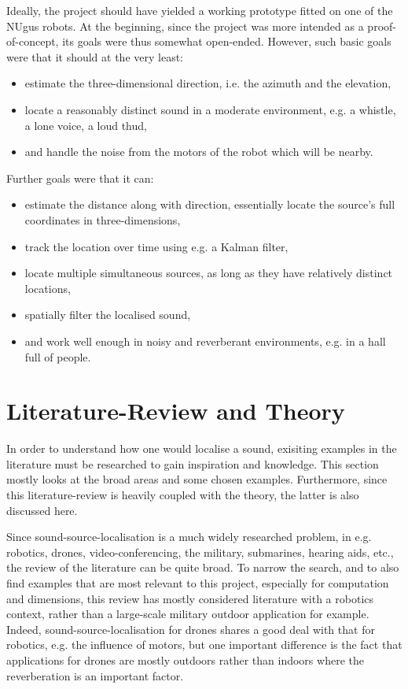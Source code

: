 \documentclass[notitlepage]{report}
\begin{document}
Ideally, the project should have yielded a working prototype fitted on one of the NUgus robots. At the beginning, since the project was more intended as a proof-of-concept, its goals were thus somewhat open-ended. However, such basic goals were that it should at the very least:
\begin{itemize}
	\item estimate the three-dimensional direction, i.e. the azimuth and the elevation,
	\item locate a reasonably distinct sound in a moderate environment, e.g. a whistle, a lone voice, a loud thud,
	\item and handle the noise from the motors of the robot which will be nearby.
\end{itemize}
Further goals were that it can:
\begin{itemize}
	\item estimate the distance along with direction, essentially locate the source's full coordinates in three-dimensions,
	\item track the location over time using e.g. a Kalman filter,
	\item locate multiple simultaneous sources, as long as they have relatively distinct locations,
	\item spatially filter the localised sound,
	\item and work well enough in noisy and reverberant environments, e.g. in a hall full of people.
\end{itemize}


\chapter{Literature-Review and Theory}

In order to understand how one would localise a sound, exisiting examples in the literature must be researched to gain inspiration and knowledge. This section mostly looks at the broad areas and some chosen examples. Furthermore, since this literature-review is heavily coupled with the theory, the latter is also discussed here. 

Since sound-source-localisation is a much widely researched problem, in e.g. robotics, drones, video-conferencing, the military, submarines, hearing aids, etc., the review of the literature can be quite broad. To narrow the search, and to also find examples that are most relevant to this project, especially for computation and dimensions, this review has mostly considered literature with a robotics context, rather than a large-scale military outdoor application for example. Indeed, sound-source-localisation for drones shares a good deal with that for robotics, e.g. the influence of motors, but one important difference is the fact that applications for drones are mostly outdoors rather than indoors where the reverberation is an important factor.
\end{document}
